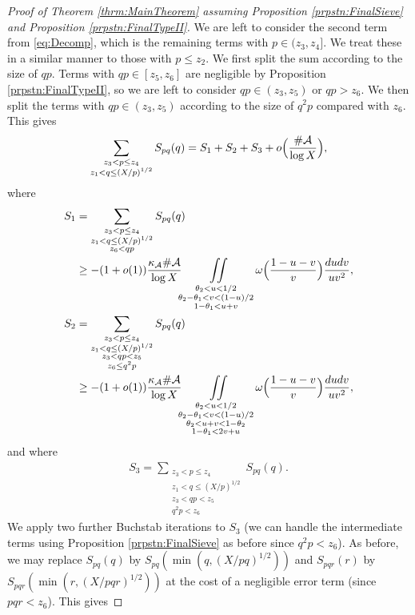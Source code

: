 \documentclass[10pt]{amsart}
\theoremstyle{plain}
\numberwithin{sblmm}{thrm}
\numberwithin{equation}{section}
\begin{document}
\begin{proof}[Proof of Theorem \ref{thrm:MainTheorem} assuming Proposition \ref{prpstn:FinalSieve} and Proposition \ref{prpstn:FinalTypeII}]
We are left to consider the second term from \eqref{eq:Decomp}, which is the remaining terms with $p\in(z_3,z_4]$. We treat these in a similar manner to those with $p\le z_2$. We first split the sum according to the size of $q p$. Terms with $q p\in [z_5,z_6]$ are negligible by Proposition \ref{prpstn:FinalTypeII}, so we are left to consider $q p\in(z_3,z_5)$ or $q p>z_6$. We then split the terms with $q p\in(z_3,z_5)$ according to the size of $q^2 p$ compared with $z_6$. This gives
\[
\sum_{\substack{z_3<p\le z_4 \\ z_1<q\le (X/p)^{1/2}}}S_{p q}(q)
=S_1+S_2+S_3+o\Bigl(\frac{\#\mathcal{A}{}}{\log{X}}\Bigr),
\]
where
%
\begingroup
\allowdisplaybreaks
\begin{align}
S_1
&=\sum_{\substack{z_3<p\le z_4 \\ z_1<q\le (X/p)^{1/2}\\ z_6<q p}}S_{p q}(q)\nonumber\\
&\ge-(1+o(1))\frac{\kappa_{\mathcal{A}}\#\mathcal{A}{}}{\log{X}}
\iint\limits_{\substack{\theta_2<u<1/2 \\ \theta_2-\theta_1<v<(1-u)/2 \\1-\theta_1<u+v}}\omega\Bigl(\frac{1-u-v}{v}\Bigr)\frac{d u d v}{u v^2},
\label{eq:I7}\\
S_2
&=\sum_{\substack{z_3<p\le z_4 \\ z_1<q\le (X/p)^{1/2}\\ z_3<q p<z_5\\ z_6\le q^2 p}}S_{p q}(q)\nonumber\\
&\ge -(1+o(1))\frac{\kappa_{\mathcal{A}}\#\mathcal{A}{}}{\log{X}}
\iint\limits_{\substack{\theta_2<u<1/2\\ \theta_2-\theta_1<v<(1-u)/2\\ \theta_2<u+v<1-\theta_2\\ 1-\theta_1<2v+u}}\omega\Bigl(\frac{1-u-v}{v}\Bigr)\frac{d u d v}{u v^2},
\label{eq:I8}
\end{align}
\endgroup
%
and where
%
\begin{align}
S_3=\sum_{\substack{z_3<p\le z_4\\ z_1<q\le (X/p)^{1/2}\\ z_3<q p<z_5 \\ q^2p <z_6}}S_{p q}(q).\nonumber
\end{align}
%
We apply two further Buchstab iterations to $S_3$ (we can handle the intermediate terms using Proposition \ref{prpstn:FinalSieve} as before since $q^2p<z_6$). As before, we may replace $S_{p q}(q)$ by $S_{p q}(\min(q,(X/p q)^{1/2}))$ and $S_{p q r}(r)$ by $S_{p q r}(\min(r,(X/p q r)^{1/2}))$ at the cost of a negligible error term (since $p q r<z_6$). This gives

\end{proof}
\end{document}
